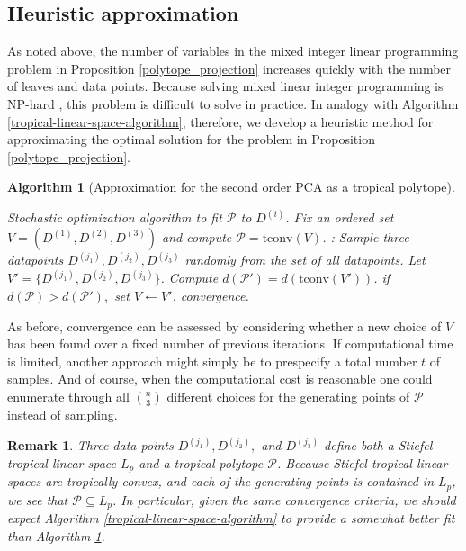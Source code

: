 \documentclass[12pt]{extarticle}
\numberwithin{theorem}{section}
\newtheorem{remark}[theorem]{Remark}
\newtheorem{algorithm}[theorem]{Algorithm}
\begin{document}
\subsection{Heuristic approximation}
As noted above, the number of variables in the mixed integer linear programming problem in Proposition \ref{polytope_projection} increases quickly with the number of leaves and data points. Because solving mixed linear integer
programming is NP-hard \cite{Lenstra},
this problem is difficult to solve in practice. In analogy with Algorithm \ref{tropical-linear-space-algorithm}, therefore, we develop a heuristic method for approximating the optimal solution for the problem in Proposition 
\ref{polytope_projection}.  
\begin{algorithm}[Approximation for the second order PCA as a tropical polytope]\label{al1} %
\begin{algorithmic}
\State Stochastic optimization algorithm to fit $\mathcal P$ to $D^{(i)}$.
\State Fix an ordered set $V = (D^{(1)}, D^{(2)}, D^{(3)})$ and compute $\mathcal P = \text{tconv}(V)$. 
\Repeat:
	\State Sample three datapoints $D^{(j_1)}, D^{(j_2)}, D^{(j_3)}$ randomly from the set of all datapoints.
	\State Let $V' = \{D^{(j_1)}, D^{(j_2)}, D^{(j_3)}\}$.
	\State Compute $d(\mathcal P') = d(\text{tconv}(V'))$.
	\State if $d(\mathcal P)>d(\mathcal P'),$ set $V \gets V'$.
\Until convergence.
\end{algorithmic}
\end{algorithm}

As before, convergence can be assessed by considering whether a new choice of $V$ has been found over a fixed number of previous iterations. If computational time is limited, another approach might simply be to prespecify a total number $t$ of samples. And of course, when the computational cost is reasonable one could enumerate through all $\binom n 3$ different choices for the generating points of $\mathcal P$ instead of sampling.

\begin{remark}
Three data points $D^{(j_1)}, D^{(j_2)},$ and $D^{(j_3)}$ define both a Stiefel tropical linear space $L_p$ and a tropical polytope $\mathcal P$. Because Stiefel tropical linear spaces are tropically convex, and each of the generating points is contained in $L_p$, we see that $\mathcal P\subseteq L_p$. In particular, given the same convergence criteria, we should expect Algorithm \ref{tropical-linear-space-algorithm} to provide a somewhat better fit than Algorithm \ref{al1}.
\end{remark}
\end{document}
